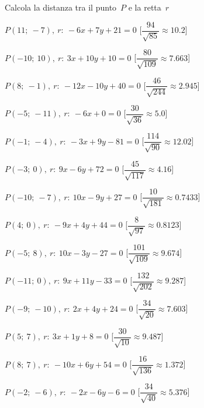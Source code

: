 \begin{esercizio}\label{ese:}
 Calcola la distanza tra il punto~$P$ e la retta~$r$
 \begin{enumeratea}
  \item  $P(11;~-7),~r:~-6 x + 7 y + 21 = 0$ \hfill 
   [$\dfrac{94}{\sqrt{85}}\approx  10.2$]
  \item  $P(-10;~10),~r:~3 x + 10 y + 10 = 0$ \hfill 
   [$\dfrac{80}{\sqrt{109}}\approx 7.663$]
  \item  $P(8;~-1),~r:~-12 x - 10 y + 40 = 0$ \hfill 
   [$\dfrac{46}{\sqrt{244}}\approx 2.945$]
  \item  $P(-5;~-11),~r:~-6 x + 0 = 0$ \hfill 
   [$\dfrac{30}{\sqrt{36}}\approx   5.0$]
  \item  $P(-1;~-4),~r:~-3 x + 9 y - 81 = 0$ \hfill 
   [$\dfrac{114}{\sqrt{90}}\approx 12.02$]
  \item  $P(-3;~0),~r:~9 x - 6 y + 72 = 0$ \hfill 
   [$\dfrac{45}{\sqrt{117}}\approx  4.16$]
  \item  $P(-10;~-7),~r:~10 x - 9 y + 27 = 0$ \hfill 
   [$\dfrac{10}{\sqrt{181}}\approx0.7433$]
  \item  $P(4;~0),~r:~-9 x + 4 y + 44 = 0$ \hfill 
   [$\dfrac{8}{\sqrt{97}}\approx0.8123$]
  \item  $P(-5;~8),~r:~10 x - 3 y - 27 = 0$ \hfill 
   [$\dfrac{101}{\sqrt{109}}\approx 9.674$]
  \item  $P(-11;~0),~r:~9 x + 11 y - 33 = 0$ \hfill 
   [$\dfrac{132}{\sqrt{202}}\approx 9.287$]
  \item  $P(-9;~-10),~r:~2 x + 4 y + 24 = 0$ \hfill 
   [$\dfrac{34}{\sqrt{20}}\approx 7.603$]
  \item  $P(5;~7),~r:~3 x + 1 y + 8 = 0$ \hfill 
   [$\dfrac{30}{\sqrt{10}}\approx 9.487$]
  \item  $P(8;~7),~r:~-10 x + 6 y + 54 = 0$ \hfill 
   [$\dfrac{16}{\sqrt{136}}\approx 1.372$]
  \item  $P(-2;~-6),~r:~-2 x - 6 y - 6 = 0$ \hfill 
   [$\dfrac{34}{\sqrt{40}}\approx 5.376$]
 \end{enumeratea}
\end{esercizio}


